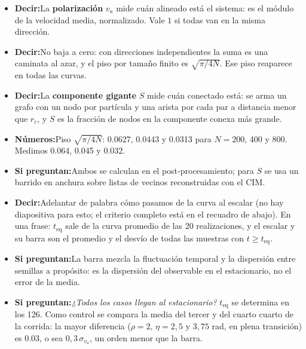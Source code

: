 \documentclass[10pt,a4paper]{article}
\newcommand{\va}{\ensuremath{v_a}}
\newcommand{\teq}{\ensuremath{t_{\mathrm{eq}}}}
\newcommand{\diapo}[3]{%
    \needspace{5\baselineskip}%
    \vspace{0.7em}%
    \noindent\colorbox{azul}{\makebox[2.1em]{\color{white}\bfseries\small #1}}%
    \colorbox{grisclaro}{\makebox[\dimexpr\linewidth-2.1em-4\fboxsep\relax][l]{%
        \color{azul}\bfseries\small\hspace{0.4em}#2\hfill
        {\color{gris}\mdseries #3}\hspace{0.4em}}}%
    \par\vspace{0.35em}}
\newcommand{\decir}{\textbf{\color{azul}Decir:}\;}
\newcommand{\nums}{\textbf{\color{acento}Números:}\;}
\newcommand{\preg}{\textbf{\color{gris}Si preguntan:}\;}
\newenvironment{notas}
    {\begin{itemize}[leftmargin=1.1em,itemsep=0.15em,topsep=0.15em,parsep=0pt]}
    {\end{itemize}}
\begin{document}
\diapo{9}{Observables}{\SI{60}{s}}
\begin{notas}
    \item \decir La \textbf{polarización} \va{} mide cuán alineado está el
          sistema: es el módulo de la velocidad media, normalizado. Vale $1$ si
          todas van en la misma dirección.
    \item \decir No baja a cero: con direcciones independientes la suma es una
          caminata al azar, y el piso por tamaño finito es $\sqrt{\pi/4N}$. Ese
          piso reaparece en todas las curvas.
    \item \decir La \textbf{componente gigante} $S$ mide cuán conectado está:
          se arma un grafo con un nodo por partícula y una arista por cada par a
          distancia menor que $r_c$, y $S$ es la fracción de nodos en la
          componente conexa más grande.
    \item \nums Piso $\sqrt{\pi/4N}$: \num{0.0627}, \num{0.0443} y \num{0.0313}
          para $N = 200$, \num{400} y \num{800}. Medimos \num{0.064},
          \num{0.045} y \num{0.032}.
    \item \preg Ambos se calculan en el post-procesamiento; para $S$ se usa un
          barrido en anchura sobre listas de vecinos reconstruidas con el CIM.
    \item \decir Adelantar de palabra cómo pasamos de la curva al escalar (no
          hay diapositiva para esto; el criterio completo está en el recuadro
          de abajo). En una frase: \teq{} sale de la curva promedio de las
          \num{20} realizaciones, y el escalar y su barra son el promedio y el
          desvío de todas las muestras con $t \ge \teq$.
    \item \preg La barra mezcla la fluctuación temporal y la dispersión entre
          semillas a propósito: es la dispersión del observable en el
          estacionario, no el error de la media.
    \item \preg \emph{¿Todos los casos llegan al estacionario?} \teq{} se
          determina en los \num{126}. Como control se compara la media del
          tercer y del cuarto cuarto de la corrida: la mayor diferencia
          ($\rho = 2$, $\eta = 2{,}5$ y $3{,}75$ rad, en plena transición) es
          \num{0.03}, o sea $0{,}3\,\sigma_{\va}$, un orden menor que la
          barra.
\end{notas}
\end{document}
